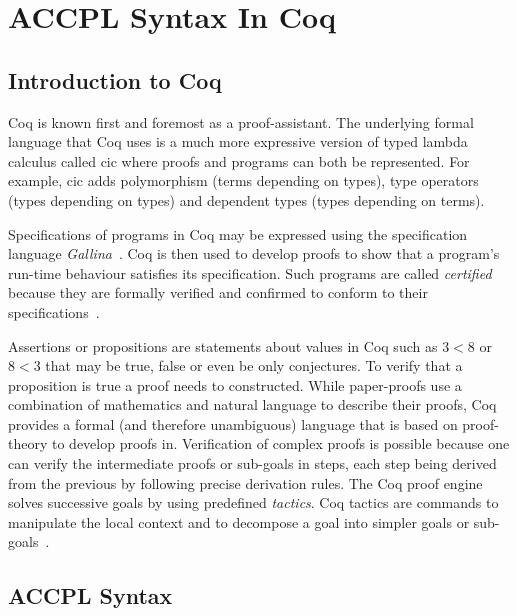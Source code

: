 \chapter{ACCPL Syntax In Coq}\label{chap:odrl0syntaxcoq}

\section{Introduction to Coq}

Coq is known first and foremost as a proof-assistant. The underlying formal language that Coq uses is a much more expressive version of typed lambda calculus called \ac{cic} where proofs and programs can both be represented. For example, \ac{cic} adds polymorphism (terms depending on types), type operators (types depending on types) and dependent types (types depending on terms).

Specifications of programs in Coq may be expressed using the specification language \emph{Gallina}~\cite{gallinaref}. Coq is then used to develop proofs to show that a program's run-time behaviour satisfies its specification. Such programs are called \emph{certified} because they are formally verified and confirmed to conform to their specifications~\cite{BC04}.

Assertions or propositions are statements about values in Coq such as $3<8$ or $8<3$ that may be true, false or even be only conjectures. To verify that a proposition is true a proof needs to constructed. While paper-proofs use a combination of mathematics and natural language to describe their proofs, Coq provides a formal (and therefore unambiguous) language that is based on proof-theory to develop proofs in. Verification of complex proofs is possible because one can verify the intermediate proofs or sub-goals in steps, each step being derived from the previous by following precise derivation rules. The Coq proof engine solves successive goals by using predefined \emph{tactics}. Coq tactics are commands to manipulate the local context and to decompose a goal into simpler goals or sub-goals~\cite{BC04}.

\section{ACCPL Syntax}\label{sec:agreementConstructor}

